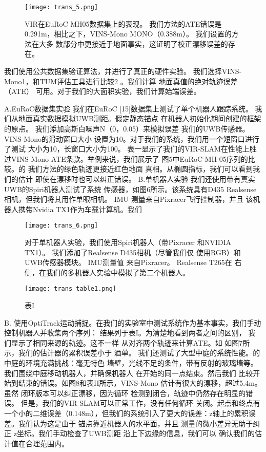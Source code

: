 \begin{translation}
\begin{figure}
  \centering
  \texttt{[image: trans\_5.png]}
  \caption{VIR在EuRoC MH05数据集上的表现。 我们方法的ATE错误是
0.291m，相比之下，VINS-Mono MONO（0.388m）。 我们设置的方法在大多
数部分中更接近于地面事实，这证明了校正漂移误差的存在。}
  \label{fig:gmapping}
\end{figure}


我们使用公共数据集验证算法，并进行了真正的硬件实验。 我们选择VINS-Mono1，和TUM评估工具进行比较2
。我们计算 地面真值的绝对轨迹误差（ATE） 可用。对于我们的大面积实验，我们计算始端误差。 

A.EuRoC数据集实验 我们在EuRoC [15]数据集上测试了单个机器人跟踪系统。
我们从地面真实数据模拟UWB测距。假定静态锚点 在机器人初始化期间创建的框架的原点。
我们添加高斯白噪声N（0，0.05）来模拟误差 我们的UWB传感器。 VINS-Mono的滑动窗口大小
设置为10。对于我们的系统，我们用一个短窗口进行了测试 大小为10，长窗口大小为100。 表一显示了我们的VIR-SLAM在性能上胜过VINS-Mono
ATE条款。举例来说，我们展示了 图5中EuRoC MH-05序列的比较。的 我们方法的绿色轨迹更接近红色地面
真相。从椭圆指标，我们可以看到我们的估计 即使在漂移时也可以纠正错误。 B.单机器人实验
我们还使用带有真实UWB的Spiri机器人测试了系统 传感器，如图6所示。该系统具有D435 Realsense 相机，但我们将其用作单眼相机。 IMU
测量来自Pixracer飞行控制器，并且 该机器人携带Nvidia TX1作为车载计算机。我们 



\begin{figure}
  \centering
  \texttt{[image: trans\_6.png]}
  \caption{对于单机器人实验，我们使用Spiri机器人（带Pixracer
和NVIDIA TX1）。 我们添加了Realsense D435相机（尽管我们仅
使用RGB）和UWB传感器模块。 IMU测量值
来自Pixracer。 Realsense T265在
右侧，在我们的多机器人实验中模拟了第二个机器人。}
  \label{fig:gmapping}
\end{figure}

\begin{figure}
  \centering
  \texttt{[image: trans\_table1.png]}
  \caption{表I}
  \label{fig:gmapping}
\end{figure}

B. 使用OptiTrack运动捕捉。在我们的实验室中测试系统作为基本事实，我们手动控制机器人并收集两个序列：
结果列于表I。为清楚地看到两者之间的区别， 我们显示了相同来源的轨迹。这不一样 从对齐两个轨迹来计算ATE。如
如图7所示，我们的估计器的累积误差小于 酒单。 我们还测试了大型中庭的系统性能。的 中庭的环境充满挑战：毫无特色
墙壁，光线不足的条件，带有反射的玻璃墙等。 我们围绕中庭移动机器人，并确保机器人 在开始的同一点结束。然后我们
比较开始到结束的错误。如图8和表II所示，VINS-Mono 估计有很大的漂移，超过5.4m。虽然
闭环版本可以纠正漂移，因为循环 检测到闭合，轨迹中仍然存在明显的错误。 但是，我们的VIR SLAM可以正常工作，没有任何循环
关闭。起点和终点有一个小的二维误差（0.148m），但我们的系统引入了更大的误差：z轴上的累积误差。我们认为这是由于
锚点靠近机器人的水平面，并且 测量的微小差异无助于纠正 z坐标。我们手动检查了UWB测距
沿上下边缘的信息，我们可以 确认我们的估计值在合理范围内。



\end{translation}
